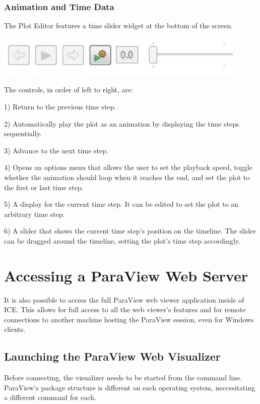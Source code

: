 \documentclass{article}
\begin{document}
\subsubsection{Animation and Time Data}

The Plot Editor features a time slider widget at the bottom of the screen. 

\begin{center}
\includegraphics[width=12cm]{images/TimeSliderWidget}
\end{center}

The controls, in order of left to right, are:

1) Return to the previous time step.

2) Automatically play the plot as an animation by displaying the time steps
sequentially. 

3) Advance to the next time step. 

4) Opens an options menu that allows the user to set the playback speed, toggle
whether the animation should loop when it reaches the end, and set the plot to
the first or last time step.

5) A display for the current time step. It can be edited to set the plot to an
arbitrary time step. 

6) A slider that shows the current time step's position on the timeline. The
slider can be dragged around the timeline, setting the plot's time step
accordingly.

\section{Accessing a ParaView Web Server}

It is also possible to access the full ParaView web viewer application inside of
ICE. This allows for full access to all the web viewer's features and for remote
connections to another machine hosting the ParaView session, even for Windows
clients.

\subsection{Launching the ParaView Web Visualizer}

Before connecting, the visualizer needs to be started from the command line.
ParaView's package structure is different on each operating system,
neccesitating a different command for each.
\end{document}
